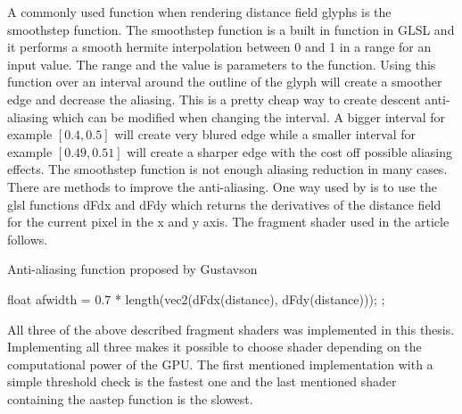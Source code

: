 A commonly used function when rendering distance field glyphs is the smoothstep function. The smoothstep function is a built in function in GLSL and it performs a smooth hermite interpolation between 0 and 1 in a range for an input value. The range and the value is parameters to the function. Using this function over an interval around the outline of the glyph will create a smoother edge and decrease the aliasing. This is a pretty cheap way to create descent anti-aliasing which can be modified when changing the interval. A bigger interval for example $[0.4,0.5]$ will create very blured edge while a smaller interval for example $[0.49,0.51]$ will create a sharper edge with the cost off possible aliasing effects. The smoothstep function is not enough aliasing reduction in many cases. There are methods to improve the anti-aliasing. One way used by \citet{gustavson20122d} is to use the glsl functions dFdx and dFdy which returns the derivatives of the distance field for the current pixel in the x and y axis. The fragment shader used in the article follows.
\begin{algorithm}[H]
\caption{Anti-aliasing function proposed by Gustavson}
\begin{algorithmic}
\State float afwidth = 0.7 * length(vec2(dFdx(distance), dFdy(distance)));
\State \Return {};
\EndProcedure
\end{algorithmic}
\end{algorithm}
All three of the above described fragment shaders was implemented in this thesis. Implementing all three makes it possible to choose shader depending on the computational power of the GPU. The first mentioned implementation with a simple threshold check is the fastest one and the last mentioned shader containing the aastep function is the slowest.
